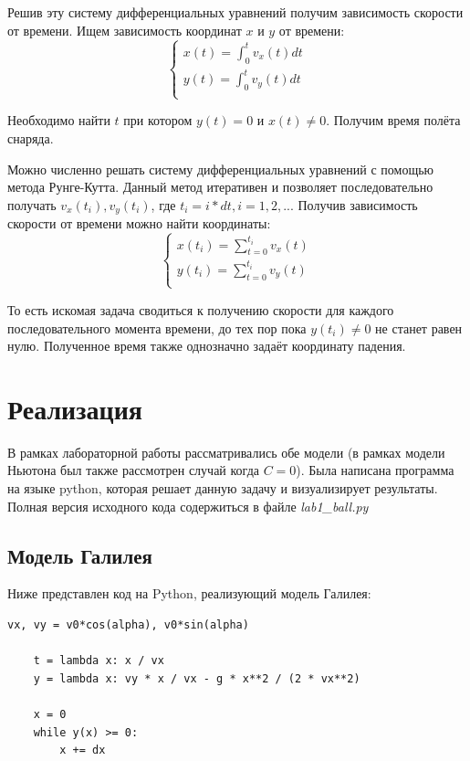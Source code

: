 \documentclass[12pt,a4paper,oneside]{extarticle}
\begin{document}
        Решив эту систему дифференциальных уравнений получим зависимость скорости от времени. Ищем зависимость координат $x$ и $y$ от времени: 
        \begin{equation*}
            \begin{cases}
                x(t)=\int_{0}^{t} v_x(t) dt \\
                y(t)=\int_{0}^{t} v_y(t) dt \\
            \end{cases}
        \end{equation*}

        Необходимо найти $t$ при котором $y(t)=0$ и $x(t)\neq0$. Получим время полёта снаряда. 
        
        Можно численно решать систему дифференциальных уравнений с помощью метода Рунге-Кутта. Данный метод итеративен и позволяет последовательно получать $v_x(t_i), v_y(t_i)$, где $t_i=i*dt, i=1,2,...$ Получив зависимость скорости от времени можно найти координаты: 
         \begin{equation*}
            \begin{cases}
                x(t_i)=\sum_{t=0}^{t_i} v_x(t) \\
                y(t_i)=\sum_{t=0}^{t_i} v_y(t) \\
            \end{cases}
        \end{equation*}

        То есть искомая задача сводиться к получению скорости для каждого последовательного момента времени, до тех пор пока $y(t_i)\neq0$ не станет равен нулю. Полученное время также однозначно задаёт координату падения.

\section{Реализация}
    В рамках лабораторной работы рассматривались обе модели (в рамках модели Ньютона был также рассмотрен случай когда $C=0$). Была написана программа на языке python, которая решает данную задачу и визуализирует результаты. Полная версия исходного кода содержиться в файле {\it lab1\_ball.py}

    \subsection{Модель Галилея}
    Ниже представлен код на Python, реализующий модель Галилея:
    \lstset{language=Python}
        \begin{lstlisting}[mathescape] 
    vx, vy = v0*cos(alpha), v0*sin(alpha)

    t = lambda x: x / vx
    y = lambda x: vy * x / vx - g * x**2 / (2 * vx**2)

    x = 0
    while y(x) >= 0:
        x += dx
    \end{lstlisting}
\end{document}
